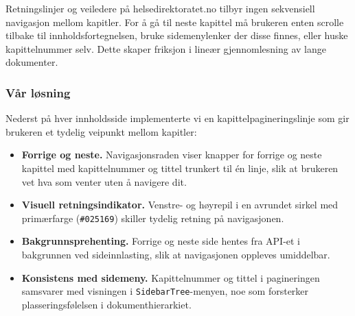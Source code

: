 
Retningslinjer og veiledere på helsedirektoratet.no tilbyr ingen
sekvensiell navigasjon mellom kapitler. For å gå til neste kapittel
må brukeren enten scrolle tilbake til innholdsfortegnelsen, bruke
sidemenylenker der disse finnes, eller huske kapittelnummer selv.
Dette skaper friksjon i lineær gjennomlesning av lange dokumenter.

\subsubsection{Vår løsning}
\label{sec:kapittelpaginering-var}


Nederst på hver innholdsside implementerte vi en
kapittelpagineringslinje som gir brukeren et tydelig veipunkt mellom
kapitler:

\begin{itemize}
    \item \textbf{Forrige og neste.} Navigasjonsraden viser knapper
          for forrige og neste kapittel med kapittelnummer og tittel
          trunkert til én linje, slik at brukeren vet hva som venter
          uten å navigere dit.

    \item \textbf{Visuell retningsindikator.} Venstre- og høyrepil
          i en avrundet sirkel med primærfarge (\texttt{\#025169})
          skiller tydelig retning på navigasjonen.

    \item \textbf{Bakgrunnsprehenting.} Forrige og neste side hentes
          fra API-et i bakgrunnen ved sideinnlasting, slik at
          navigasjonen oppleves umiddelbar.

    \item \textbf{Konsistens med sidemeny.} Kapittelnummer og tittel
          i pagineringen samsvarer med visningen i
          \texttt{SidebarTree}-menyen, noe som forsterker
          plasseringsfølelsen i dokumenthierarkiet.
\end{itemize}




